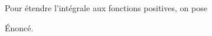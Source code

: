 Pour étendre l'intégrale aux fonctions positives, on pose
\begin{definition} %
  Énoncé.
\end{definition}
